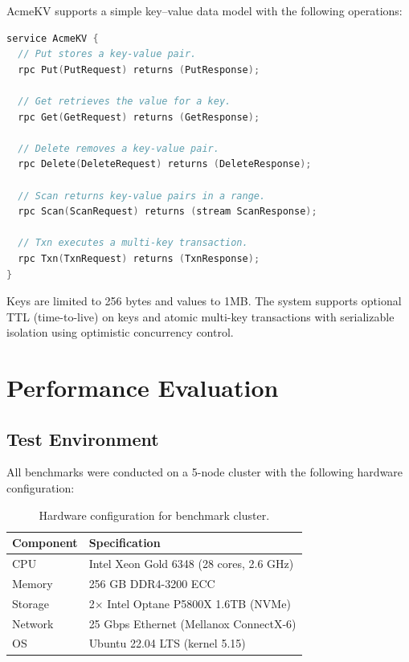 \documentclass[12pt,a4paper]{report}
\begin{document}
AcmeKV supports a simple key--value data model with the following operations:

\begin{lstlisting}[language=Go, caption={AcmeKV core API definition.}]
service AcmeKV {
  // Put stores a key-value pair.
  rpc Put(PutRequest) returns (PutResponse);

  // Get retrieves the value for a key.
  rpc Get(GetRequest) returns (GetResponse);

  // Delete removes a key-value pair.
  rpc Delete(DeleteRequest) returns (DeleteResponse);

  // Scan returns key-value pairs in a range.
  rpc Scan(ScanRequest) returns (stream ScanResponse);

  // Txn executes a multi-key transaction.
  rpc Txn(TxnRequest) returns (TxnResponse);
}
\end{lstlisting}

Keys are limited to 256 bytes and values to 1MB. The system supports optional TTL (time-to-live) on keys and atomic multi-key transactions with serializable isolation using optimistic concurrency control.

\chapter{Performance Evaluation}
\label{ch:performance}

\section{Test Environment}

All benchmarks were conducted on a 5-node cluster with the following hardware configuration:

\begin{table}[H]
\centering
\caption{Hardware configuration for benchmark cluster.}
\begin{tabular}{@{}ll@{}}
\toprule
\textbf{Component} & \textbf{Specification} \\
\midrule
CPU & Intel Xeon Gold 6348 (28 cores, 2.6 GHz) \\
Memory & 256 GB DDR4-3200 ECC \\
Storage & 2$\times$ Intel Optane P5800X 1.6TB (NVMe) \\
Network & 25 Gbps Ethernet (Mellanox ConnectX-6) \\
OS & Ubuntu 22.04 LTS (kernel 5.15) \\
\bottomrule
\end{tabular}
\end{table}
\end{document}
